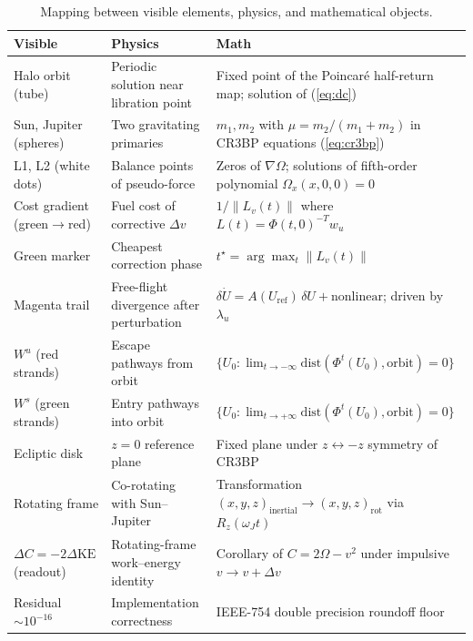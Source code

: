 \documentclass[11pt,a4paper]{article}
\begin{document}
\begin{table}[H]
\centering
\small
\caption{Mapping between visible elements, physics, and mathematical objects.}
\begin{tabularx}{\textwidth}{@{}l l X@{}}
\toprule
\textbf{Visible} & \textbf{Physics} & \textbf{Math} \\
\midrule
Halo orbit (tube)            & Periodic solution near libration point & Fixed point of the Poincaré half-return map; solution of (\ref{eq:dc}) \\
Sun, Jupiter (spheres)        & Two gravitating primaries               & $m_1, m_2$ with $\mu = m_2/(m_1+m_2)$ in CR3BP equations (\ref{eq:cr3bp}) \\
L1, L2 (white dots)           & Balance points of pseudo-force          & Zeros of $\nabla\Omega$; solutions of fifth-order polynomial $\Omega_x(x,0,0) = 0$ \\
Cost gradient (green$\to$red) & Fuel cost of corrective $\Delta v$      & $1/\|L_v(t)\|$ where $L(t) = \Phi(t,0)^{-T} w_u$ \\
Green marker                  & Cheapest correction phase               & $t^\star = \arg\max_t \|L_v(t)\|$ \\
Magenta trail                 & Free-flight divergence after perturbation & $\delta \dot U = A(U_{\text{ref}})\,\delta U + \text{nonlinear}$; driven by $\lambda_u$ \\
$W^u$ (red strands)           & Escape pathways from orbit              & $\{U_0 : \lim_{t\to-\infty} \mathrm{dist}(\Phi^t(U_0), \text{orbit}) = 0\}$ \\
$W^s$ (green strands)         & Entry pathways into orbit               & $\{U_0 : \lim_{t\to+\infty} \mathrm{dist}(\Phi^t(U_0), \text{orbit}) = 0\}$ \\
Ecliptic disk                 & $z = 0$ reference plane                  & Fixed plane under $z \leftrightarrow -z$ symmetry of CR3BP \\
Rotating frame                & Co-rotating with Sun--Jupiter           & Transformation $(x,y,z)_{\text{inertial}} \to (x,y,z)_{\text{rot}}$ via $R_z(\omega_J t)$ \\
$\Delta C = -2\Delta\mathrm{KE}$ (readout) & Rotating-frame work--energy identity & Corollary of $C = 2\Omega - v^2$ under impulsive $v \to v + \Delta v$ \\
Residual $\sim 10^{-16}$      & Implementation correctness              & IEEE-754 double precision roundoff floor \\
\bottomrule
\end{tabularx}
\end{table}
\end{document}
